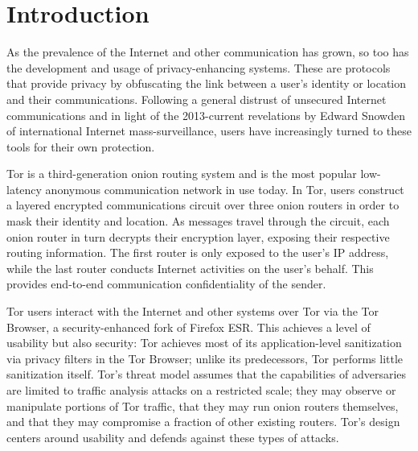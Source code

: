 \documentclass[USenglish,oneside,twocolumn]{article}
\begin{document}
 
\maketitle

\section{Introduction}

As the prevalence of the Internet and other communication has grown, so too has the development and usage of privacy-enhancing systems. These are protocols that provide privacy by obfuscating the link between a user's identity or location and their communications. Following a general distrust of unsecured Internet communications and in light of the 2013-current revelations by Edward Snowden of international Internet mass-surveillance, users have increasingly turned to these tools for their own protection.

Tor \cite{dingledine2004tor} is a third-generation onion routing system and is the most popular low-latency anonymous communication network in use today. In Tor, users construct a layered encrypted communications circuit over three onion routers in order to mask their identity and location. As messages travel through the circuit, each onion router in turn decrypts their encryption layer, exposing their respective routing information. The first router is only exposed to the user's IP address, while the last router conducts Internet activities on the user's behalf. This provides end-to-end communication confidentiality of the sender.


Tor users interact with the Internet and other systems over Tor via the Tor Browser, a security-enhanced fork of Firefox ESR. This achieves a level of usability but also security: Tor achieves most of its application-level sanitization via privacy filters in the Tor Browser; unlike its predecessors, Tor performs little sanitization itself. Tor's threat model assumes that the capabilities of adversaries are limited to traffic analysis attacks on a restricted scale; they may observe or manipulate portions of Tor traffic, that they may run onion routers themselves, and that they may compromise a fraction of other existing routers. Tor's design centers around usability and defends against these types of attacks.
\end{document}
